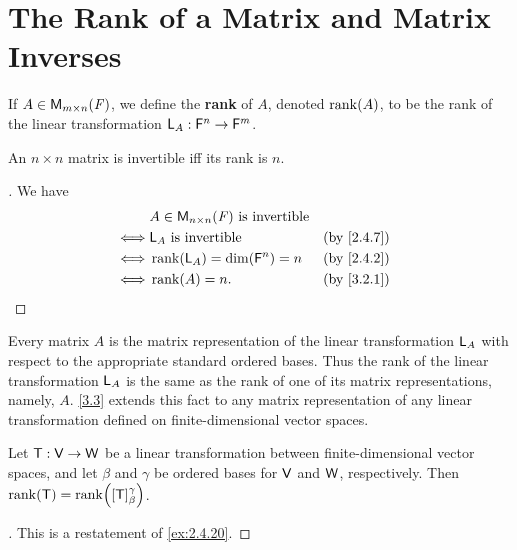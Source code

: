 \section{The Rank of a Matrix and Matrix Inverses}\label{sec:3.2}

\begin{defn}\label{3.2.1}
	If \(A \in \ms\), we define the \textbf{rank} of \(A\), denoted \(\rk{A}\), to be the rank of the linear transformation \(\mathsf{L}_A : \mathsf{F}^n \to \mathsf{F}^m\).
\end{defn}

\begin{cor}\label{3.2.2}
	An \(n \times n\) matrix is invertible iff its rank is \(n\).
\end{cor}

\begin{proof}[]
	We have
	\begin{align*}
		     & A \in \ms[n][n][\F] \text{ is invertible}                 \\
		\iff & \L_A \text{ is invertible}                &  & \by{2.4.7} \\
		\iff & \rk{\L_A} = \dim(\vs{F}^n) = n            &  & \by{2.4.2} \\
		\iff & \rk{A} = n.                               &  & \by{3.2.1}
	\end{align*}
\end{proof}

\begin{note}
	Every matrix \(A\) is the matrix representation of the linear transformation \(\mathsf{L}_A\) with respect to the appropriate standard ordered bases.
	Thus the rank of the linear transformation \(\mathsf{L}_A\) is the same as the rank of one of its matrix representations, namely, \(A\).
	\cref{3.3} extends this fact to any matrix representation of any linear transformation defined on finite-dimensional vector spaces.
\end{note}

\begin{thm}\label{3.3}
	Let \(\mathsf{T} : \mathsf{V} \to \mathsf{W}\) be a linear transformation between finite-dimensional vector spaces, and let \(\beta\) and \(\gamma\) be ordered bases for \(\mathsf{V}\) and \(\mathsf{W}\), respectively.
	Then \(\rk{\T} = \rk{[\T]_{\beta}^{\gamma}}\).
\end{thm}

\begin{proof}[]
	This is a restatement of \cref{ex:2.4.20}.
\end{proof}

